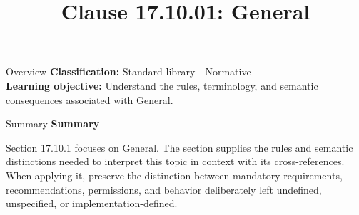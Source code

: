 \documentclass[10pt,letterpaper]{article}
\title{Clause 17.10.01: General}
\author{}
\date{}
\begin{document}
\maketitle
\begin{CornellOverviewBox}{Overview}
\textbf{Classification:} Standard library - Normative\\[2pt]
\textbf{Learning objective:} Understand the rules, terminology, and semantic consequences associated with General.
\end{CornellOverviewBox}\begin{CornellSummaryBox}{Summary}
{\sffamily\bfseries\color{Accent} Summary}\par\vspace{3pt}Section 17.10.1 focuses on General. The section supplies the rules and semantic distinctions needed to interpret this topic in context with its cross-references. When applying it, preserve the distinction between mandatory requirements, recommendations, permissions, and behavior deliberately left undefined, unspecified, or implementation-defined.
\end{CornellSummaryBox}
\end{document}
